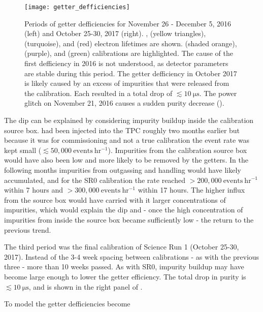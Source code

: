 \begin{figure}
\centering
\texttt{[image: getter\_defficiencies]}
\caption{Periods of getter defficiencies for November 26 - December 5, 2016 (left) and October 25-30, 2017 (right).  ,
(yellow triangles),  (turquoise), and  (red) electron lifetimes are shown.  \metakr (shaded orange),
 (purple), and \ambe (green) calibrations are highlighted.  The cause of the first defficiency in 2016 is not understood, as
detector parameters are stable during this period.  The getter defficiency in October 2017 is likely caused by an excess of impurities
that were released from the  calibration.  Each resulted in a total drop of $\lesssim 10\ \mathrm{\mu s}$.  The power glitch
on November 21, 2016 causes a sudden purity decrease ().}
\label{fig:electron_lifetime_model_detector_effects_getter_getter_defficiencies}
\end{figure}

The dip can be explained by considering impurity buildup inside the calibration source box.   had been injected into the TPC
roughly two months earlier but because it was for commissioning and not a true calibration the event rate was kept small
($\lesssim 50,000\ \mathrm{events\ hr^{-1}}$).  Impurities from the calibration source box would have also been low and more likely to be
removed by the getters.  In the following months
impurities from outgassing and handling would have likely accumulated, and for the SR0 calibration the rate reached
$> 200,000\ \mathrm{events\ hr^{-1}}$ within 7 hours and $> 300,000\ \mathrm{events\ hr^{-1}}$ within 17 hours.  The higher influx from
the source box would have carried with it larger concentrations of impurities, which would explain the
dip and - once the high concentration of impurities from inside the source box became sufficiently low - the return to the previous
trend.

The third period was the final  calibration of Science Run 1 (October 25-30, 2017).  Instead of the 3-4 week spacing between
calibrations - as with the previous three - more than 10 weeks passed.  As with SR0, impurity buildup may have become
large enough to lower the getter efficiency.  The total drop in purity is $\lesssim 10\ \mathrm{\mu s}$, and is shown in the right panel
of .

To model the getter defficiencies 
become

